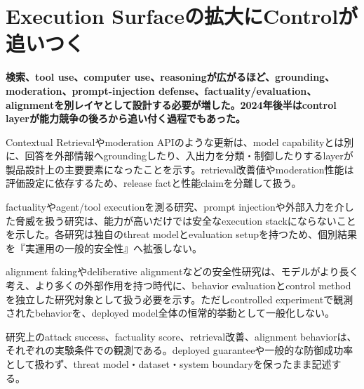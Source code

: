 \section{Execution Surfaceの拡大にControlが追いつく}
\noindent\textbf{検索、tool use、computer use、reasoningが広がるほど、grounding、moderation、prompt-injection defense、factuality/evaluation、alignmentを別レイヤとして設計する必要が増した。2024年後半はcontrol layerが能力競争の後ろから追い付く過程でもあった。}\autocite{src-308d34e54e69,src-33d811167435}

Contextual Retrievalやmoderation APIのような更新は、model capabilityとは別に、回答を外部情報へgroundingしたり、入出力を分類・制御したりするlayerが製品設計上の主要要素になったことを示す。retrieval改善値やmoderation性能は評価設定に依存するため、release factと性能claimを分離して扱う。\autocite{src-308d34e54e69,src-33d811167435}


factualityやagent/tool executionを測る研究、prompt injectionや外部入力を介した脅威を扱う研究は、能力が高いだけでは安全なexecution stackにならないことを示した。各研究は独自のthreat modelとevaluation setupを持つため、個別結果を『実運用の一般的安全性』へ拡張しない。\autocite{src-e7b786f4a622,src-f96e45232e1f}


alignment fakingやdeliberative alignmentなどの安全性研究は、モデルがより長く考え、より多くの外部作用を持つ時代に、behavior evaluationとcontrol methodを独立した研究対象として扱う必要を示す。ただしcontrolled experimentで観測されたbehaviorを、deployed model全体の恒常的挙動として一般化しない。\autocite{src-3278a129a17e,src-9cf289b414fd,src-e92e95daf8e0}


\begin{claimboundary}
研究上のattack success、factuality score、retrieval改善、alignment behaviorは、それぞれの実験条件での観測である。deployed guaranteeや一般的な防御成功率として扱わず、threat model・dataset・system boundaryを保ったまま記述する。\autocite{src-e7b786f4a622}
\end{claimboundary}
